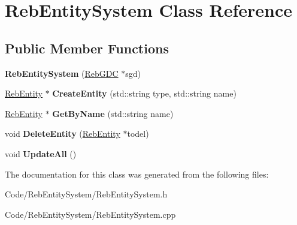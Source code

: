 \hypertarget{class_reb_entity_system}{}\section{Reb\+Entity\+System Class Reference}
\label{class_reb_entity_system}
\subsection*{Public Member Functions}
\begin{DoxyCompactItemize}
\item 
{\bfseries Reb\+Entity\+System} (\hyperlink{class_reb_g_d_c}{Reb\+G\+DC} $\ast$sgd)\hypertarget{class_reb_entity_system_aa32a0be87f9d69e72eb108a7de8e65c9}{}\label{class_reb_entity_system_aa32a0be87f9d69e72eb108a7de8e65c9}

\item 
\hyperlink{class_reb_entity}{Reb\+Entity} $\ast$ {\bfseries Create\+Entity} (std\+::string type, std\+::string name)\hypertarget{class_reb_entity_system_a9a3164b43c924ce1f98da2c3db2e6293}{}\label{class_reb_entity_system_a9a3164b43c924ce1f98da2c3db2e6293}

\item 
\hyperlink{class_reb_entity}{Reb\+Entity} $\ast$ {\bfseries Get\+By\+Name} (std\+::string name)\hypertarget{class_reb_entity_system_af29cbbb2176b4250767e0919b3cf5af1}{}\label{class_reb_entity_system_af29cbbb2176b4250767e0919b3cf5af1}

\item 
void {\bfseries Delete\+Entity} (\hyperlink{class_reb_entity}{Reb\+Entity} $\ast$todel)\hypertarget{class_reb_entity_system_ace78e2f071ec0c8d31fa1ed31e740a0f}{}\label{class_reb_entity_system_ace78e2f071ec0c8d31fa1ed31e740a0f}

\item 
void {\bfseries Update\+All} ()\hypertarget{class_reb_entity_system_a9fdc56228b5c2a446c1a387a8739737d}{}\label{class_reb_entity_system_a9fdc56228b5c2a446c1a387a8739737d}

\end{DoxyCompactItemize}


The documentation for this class was generated from the following files\+:\begin{DoxyCompactItemize}
\item 
Code/\+Reb\+Entity\+System/Reb\+Entity\+System.\+h\item 
Code/\+Reb\+Entity\+System/Reb\+Entity\+System.\+cpp\end{DoxyCompactItemize}
